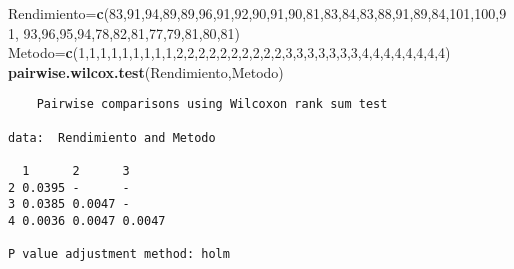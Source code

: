 \documentclass[
  a4paper,
  oneside,
  openany]{book}
\newenvironment{Shaded}{\begin{snugshade}}{\end{snugshade}}
\newcommand{\DecValTok}[1]{\textcolor[rgb]{0.00,0.00,0.81}{#1}}
\newcommand{\KeywordTok}[1]{\textcolor[rgb]{0.13,0.29,0.53}{\textbf{#1}}}
\newcommand{\NormalTok}[1]{#1}
\begin{document}
\begin{Shaded}
\begin{Highlighting}[]
\NormalTok{Rendimiento=}\KeywordTok{c}\NormalTok{(}\DecValTok{83}\NormalTok{,}\DecValTok{91}\NormalTok{,}\DecValTok{94}\NormalTok{,}\DecValTok{89}\NormalTok{,}\DecValTok{89}\NormalTok{,}\DecValTok{96}\NormalTok{,}\DecValTok{91}\NormalTok{,}\DecValTok{92}\NormalTok{,}\DecValTok{90}\NormalTok{,}\DecValTok{91}\NormalTok{,}\DecValTok{90}\NormalTok{,}\DecValTok{81}\NormalTok{,}\DecValTok{83}\NormalTok{,}\DecValTok{84}\NormalTok{,}\DecValTok{83}\NormalTok{,}\DecValTok{88}\NormalTok{,}\DecValTok{91}\NormalTok{,}\DecValTok{89}\NormalTok{,}\DecValTok{84}\NormalTok{,}\DecValTok{101}\NormalTok{,}\DecValTok{100}\NormalTok{,}\DecValTok{91}\NormalTok{,}
              \DecValTok{93}\NormalTok{,}\DecValTok{96}\NormalTok{,}\DecValTok{95}\NormalTok{,}\DecValTok{94}\NormalTok{,}\DecValTok{78}\NormalTok{,}\DecValTok{82}\NormalTok{,}\DecValTok{81}\NormalTok{,}\DecValTok{77}\NormalTok{,}\DecValTok{79}\NormalTok{,}\DecValTok{81}\NormalTok{,}\DecValTok{80}\NormalTok{,}\DecValTok{81}\NormalTok{)}
\NormalTok{Metodo=}\KeywordTok{c}\NormalTok{(}\DecValTok{1}\NormalTok{,}\DecValTok{1}\NormalTok{,}\DecValTok{1}\NormalTok{,}\DecValTok{1}\NormalTok{,}\DecValTok{1}\NormalTok{,}\DecValTok{1}\NormalTok{,}\DecValTok{1}\NormalTok{,}\DecValTok{1}\NormalTok{,}\DecValTok{1}\NormalTok{,}\DecValTok{2}\NormalTok{,}\DecValTok{2}\NormalTok{,}\DecValTok{2}\NormalTok{,}\DecValTok{2}\NormalTok{,}\DecValTok{2}\NormalTok{,}\DecValTok{2}\NormalTok{,}\DecValTok{2}\NormalTok{,}\DecValTok{2}\NormalTok{,}\DecValTok{2}\NormalTok{,}\DecValTok{2}\NormalTok{,}\DecValTok{3}\NormalTok{,}\DecValTok{3}\NormalTok{,}\DecValTok{3}\NormalTok{,}\DecValTok{3}\NormalTok{,}\DecValTok{3}\NormalTok{,}\DecValTok{3}\NormalTok{,}\DecValTok{3}\NormalTok{,}\DecValTok{4}\NormalTok{,}\DecValTok{4}\NormalTok{,}\DecValTok{4}\NormalTok{,}\DecValTok{4}\NormalTok{,}\DecValTok{4}\NormalTok{,}\DecValTok{4}\NormalTok{,}\DecValTok{4}\NormalTok{,}\DecValTok{4}\NormalTok{)}
\KeywordTok{pairwise.wilcox.test}\NormalTok{(Rendimiento,Metodo)}
\end{Highlighting}
\end{Shaded}

\begin{verbatim}
    Pairwise comparisons using Wilcoxon rank sum test 

data:  Rendimiento and Metodo 

  1      2      3     
2 0.0395 -      -     
3 0.0385 0.0047 -     
4 0.0036 0.0047 0.0047

P value adjustment method: holm 
\end{verbatim}
\end{document}
